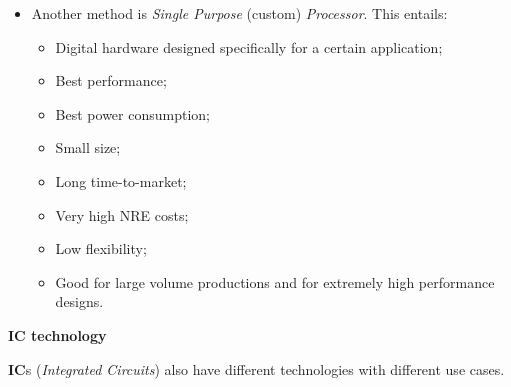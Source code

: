 \documentclass[a4paper,11pt]{article}
\begin{document}
\begin{itemize}
	\item
	      Another method is \textit{Single Purpose} (custom) \textit{Processor}.
	      This entails:
	      \begin{itemize}
		      \item Digital hardware designed specifically for a certain application;
		      \item Best performance;
		      \item Best power consumption;
		      \item Small size;
		      \item Long time-to-market;
		      \item Very high NRE costs;
		      \item Low flexibility;
		      \item Good for large volume productions and for extremely high performance designs.
	      \end{itemize}
\end{itemize}

\par\smallskip
\textbf{\textsf{IC technology}}

\textbf{IC}s (\textit{Integrated Circuits}) also have different technologies with different use cases.
\end{document}

